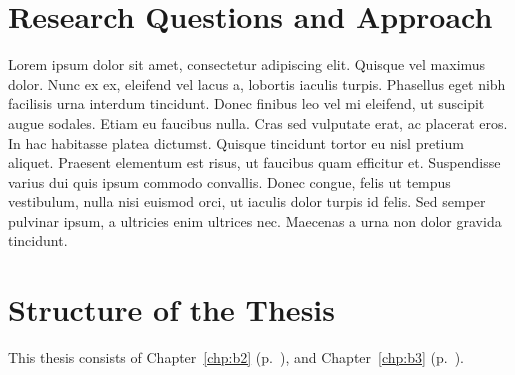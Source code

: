 \section{Research Questions and Approach}
\label{Research Questions}
	Lorem ipsum dolor sit amet, consectetur adipiscing elit. Quisque vel maximus dolor. Nunc ex ex, eleifend vel lacus a, lobortis iaculis turpis. Phasellus eget nibh facilisis urna interdum tincidunt. Donec finibus leo vel mi eleifend, ut suscipit augue sodales. Etiam eu faucibus nulla. Cras sed vulputate erat, ac placerat eros. In hac habitasse platea dictumst. Quisque tincidunt tortor eu nisl pretium aliquet. Praesent elementum est risus, ut faucibus quam efficitur et. Suspendisse varius dui quis ipsum commodo convallis. Donec congue, felis ut tempus vestibulum, nulla nisi euismod orci, ut iaculis dolor turpis id felis. Sed semper pulvinar ipsum, a ultricies enim ultrices nec. Maecenas a urna non dolor gravida tincidunt.


\section{Structure of the Thesis}
	This thesis consists of Chapter~\ref{chp:b2} (p.~\pageref{chp:b2}), and Chapter~\ref{chp:b3} (p.~\pageref{chp:b3}). 